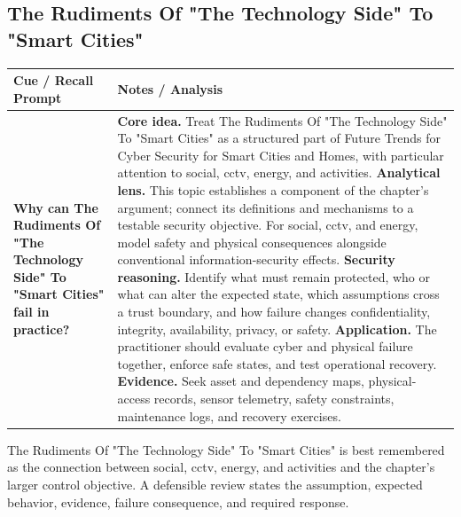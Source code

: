 \documentclass[11pt]{article}
\newcommand{\CornellHeader}{%
\rowcolor{Navy}\color{white}\bfseries Cue / Recall Prompt & \color{white}\bfseries Notes / Analysis\\\hline}
\newcommand{\CornellRow}[2]{%
\cellcolor{CueGray}\RaggedRight\textbf{#1} & \RaggedRight #2\\\hline}
\begin{document}
\subsection*{The Rudiments Of "The Technology Side" To "Smart Cities"}
\begin{longtable}{>{\RaggedRight\arraybackslash}p{}|>{\RaggedRight\arraybackslash}p{}}
\CornellHeader
\CornellRow{Why can The Rudiments Of "The Technology Side" To "Smart Cities" fail in practice?}{\textbf{Core idea.} Treat The Rudiments Of "The Technology Side" To "Smart Cities" as a structured part of Future Trends for Cyber Security for Smart Cities and Homes, with particular attention to social, cctv, energy, and activities. \textbf{Analytical lens.} This topic establishes a component of the chapter's argument; connect its definitions and mechanisms to a testable security objective. For social, cctv, and energy, model safety and physical consequences alongside conventional information-security effects. \textbf{Security reasoning.} Identify what must remain protected, who or what can alter the expected state, which assumptions cross a trust boundary, and how failure changes confidentiality, integrity, availability, privacy, or safety. \textbf{Application.} The practitioner should evaluate cyber and physical failure together, enforce safe states, and test operational recovery. \textbf{Evidence.} Seek asset and dependency maps, physical-access records, sensor telemetry, safety constraints, maintenance logs, and recovery exercises.}
\end{longtable}
\begin{topicsummary}
The Rudiments Of "The Technology Side" To "Smart Cities" is best remembered as the connection between social, cctv, energy, and activities and the chapter's larger control objective. A defensible review states the assumption, expected behavior, evidence, failure consequence, and required response.
\end{topicsummary}
\end{document}
